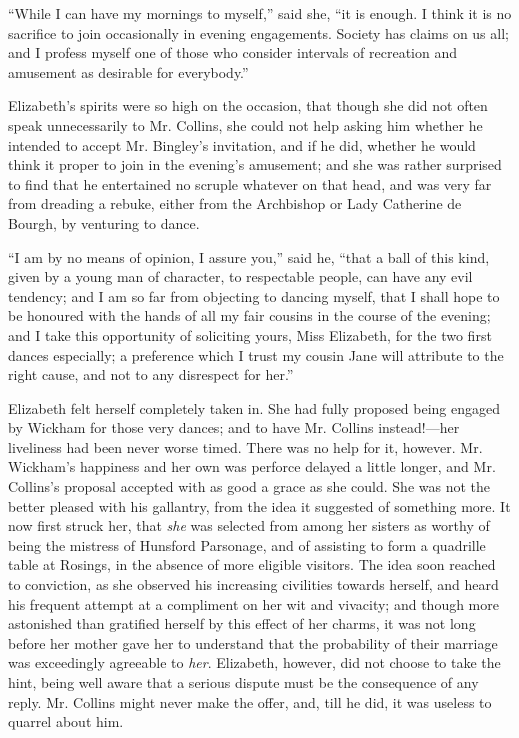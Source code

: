``While I can have my mornings to myself,'' said she, ``it is enough. I think it is no sacrifice to join occasionally in evening engagements. Society has claims on us all; and I profess myself one of those who consider intervals of recreation and amusement as desirable for everybody.''

Elizabeth's spirits were so high on the occasion, that though she did not often speak unnecessarily to Mr. Collins, she could not help asking him whether he intended to accept Mr. Bingley's invitation, and if he did, whether he would think it proper to join in the evening's amusement; and she was rather surprised to find that he entertained no scruple whatever on that head, and was very far from dreading a rebuke, either from the Archbishop or Lady Catherine de Bourgh, by venturing to dance.

``I am by no means of opinion, I assure you,'' said he, ``that a ball of this kind, given by a young man of character, to respectable people, can have any evil tendency; and I am so far from objecting to dancing myself, that I shall hope to be honoured with the hands of all my fair cousins in the course of the evening; and I take this opportunity of soliciting yours, Miss Elizabeth, for the two first dances especially; a preference which I trust my cousin Jane will attribute to the right cause, and not to any disrespect for her.''

Elizabeth felt herself completely taken in. She had fully proposed being engaged by Wickham for those very dances; and to have Mr. Collins instead!---her liveliness had been never worse timed. There was no help for it, however. Mr. Wickham's happiness and her own was perforce delayed a little longer, and Mr. Collins's proposal accepted with as good a grace as she could. She was not the better pleased with his gallantry, from the idea it suggested of something more. It now first struck her, that \textit{she} was selected from among her sisters as worthy of being the mistress of Hunsford Parsonage, and of assisting to form a quadrille table at Rosings, in the absence of more eligible visitors. The idea soon reached to conviction, as she observed his increasing civilities towards herself, and heard his frequent attempt at a compliment on her wit and vivacity; and though more astonished than gratified herself by this effect of her charms, it was not long before her mother gave her to understand that the probability of their marriage was exceedingly agreeable to \textit{her}. Elizabeth, however, did not choose to take the hint, being well aware that a serious dispute must be the consequence of any reply. Mr. Collins might never make the offer, and, till he did, it was useless to quarrel about him.

